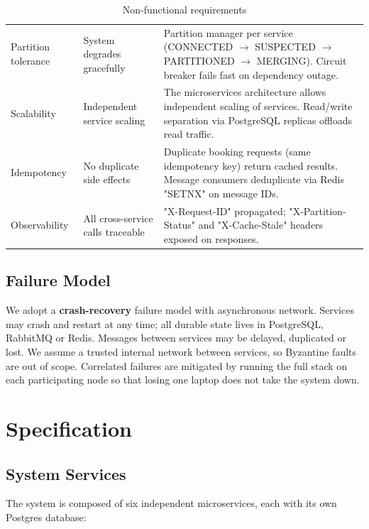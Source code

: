 \documentclass[11pt,a4paper]{article}
\begin{document}
\begin{table}[H]
\begin{tabularx}{\textwidth}{L{3.2cm} L{4.4cm} X}
  Partition tolerance & System degrades gracefully & Partition manager
        per service (CONNECTED $\to$ SUSPECTED $\to$ PARTITIONED $\to$
        MERGING). Circuit breaker fails fast on dependency outage. \\
  Scalability & Independent service scaling & The microservices architecture allows independent scaling of services. Read/write separation via PostgreSQL replicas offloads read traffic. \\
  Idempotency & No duplicate side effects & Duplicate booking requests (same idempotency key) return cached results. Message consumers deduplicate via Redis "SETNX" on message IDs. \\
  Observability & All cross-service calls traceable & "X-Request-ID"
        propagated; "X-Partition-Status" and
        "X-Cache-Stale" headers exposed on responses. \\
  \bottomrule
\end{tabularx}
\caption{Non-functional requirements}
\label{tab:nfr}
\end{table}

\subsection{Failure Model}

We adopt a \textbf{crash-recovery} failure model with asynchronous network. Services may crash and restart at any time; all durable state lives in PostgreSQL, RabbitMQ or Redis. Messages between services may be delayed, duplicated or lost. We assume a trusted internal network between services, so Byzantine faults are out of scope. Correlated failures are mitigated by running the full stack on each participating node so that losing one laptop does not take the system down.

\section{Specification}
\label{sec:specification}
 
\subsection{System Services}
 
The system is composed of six independent microservices, each with its own Postgres database:
 
\end{document}

